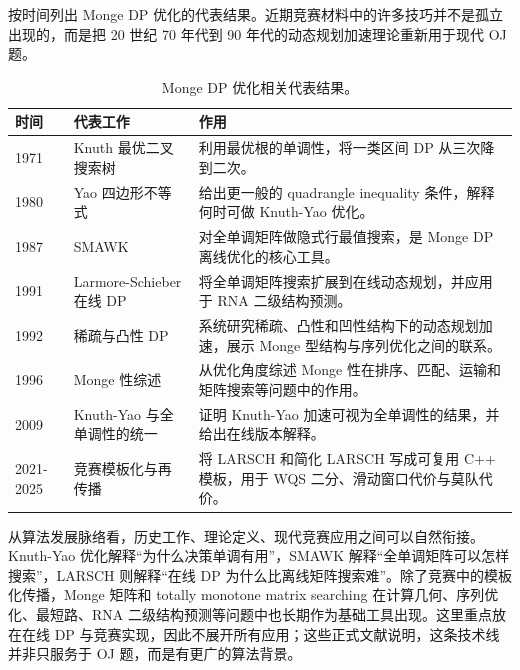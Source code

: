 \documentclass[lang=cn,a4paper,newtx,code=minted,bibtex]{elegantpaper}
\begin{document}
 按时间列出 Monge DP 优化的代表结果。近期竞赛材料中的许多技巧并不是孤立出现的，而是把 20 世纪 70 年代到 90 年代的动态规划加速理论重新用于现代 OJ 题。

\begin{table}[htbp]
\centering
\caption{Monge DP 优化相关代表结果。}
\label{tab:history}
\small
\begin{tabular}{p{}p{}p{}}
\toprule
时间 & 代表工作 & 作用 \\
\midrule
1971 & Knuth 最优二叉搜索树\cite{knuth1971obst} & 利用最优根的单调性，将一类区间 DP 从三次降到二次。 \\
1980 & Yao 四边形不等式\cite{yao1980efficient} & 给出更一般的 quadrangle inequality 条件，解释何时可做 Knuth-Yao 优化。 \\
1987 & SMAWK\cite{aggarwal1987geometric} & 对全单调矩阵做隐式行最值搜索，是 Monge DP 离线优化的核心工具。 \\
1991 & Larmore-Schieber 在线 DP\cite{larmore1991online} & 将全单调矩阵搜索扩展到在线动态规划，并应用于 RNA 二级结构预测。 \\
1992 & 稀疏与凸性 DP\cite{eppstein1992sparse1,eppstein1992sparse2,galil1992dynamic} & 系统研究稀疏、凸性和凹性结构下的动态规划加速，展示 Monge 型结构与序列优化之间的联系。 \\
1996 & Monge 性综述\cite{burkard1996perspectives} & 从优化角度综述 Monge 性在排序、匹配、运输和矩阵搜索等问题中的作用。 \\
2009 & Knuth-Yao 与全单调性的统一\cite{bein2009knuthyao} & 证明 Knuth-Yao 加速可视为全单调性的结果，并给出在线版本解释。 \\
2021-2025 & 竞赛模板化与再传播\cite{noshi2021larschlib,noshi2023simplifiedlarsch,luogu2025larsch} & 将 LARSCH 和简化 LARSCH 写成可复用 C++ 模板，用于 WQS 二分、滑动窗口代价与莫队代价。 \\
\bottomrule
\end{tabular}
\end{table}

从算法发展脉络看，历史工作、理论定义、现代竞赛应用之间可以自然衔接。Knuth-Yao 优化解释“为什么决策单调有用”，SMAWK 解释“全单调矩阵可以怎样搜索”，LARSCH 则解释“在线 DP 为什么比离线矩阵搜索难”。除了竞赛中的模板化传播，Monge 矩阵和 totally monotone matrix searching 在计算几何、序列优化、最短路、RNA 二级结构预测等问题中也长期作为基础工具出现\cite{burkard1996perspectives,eppstein1992sparse1,eppstein1992sparse2,galil1992dynamic,larmore1991online}。这里重点放在在线 DP 与竞赛实现，因此不展开所有应用；这些正式文献说明，这条技术线并非只服务于 OJ 题，而是有更广的算法背景。
\end{document}
